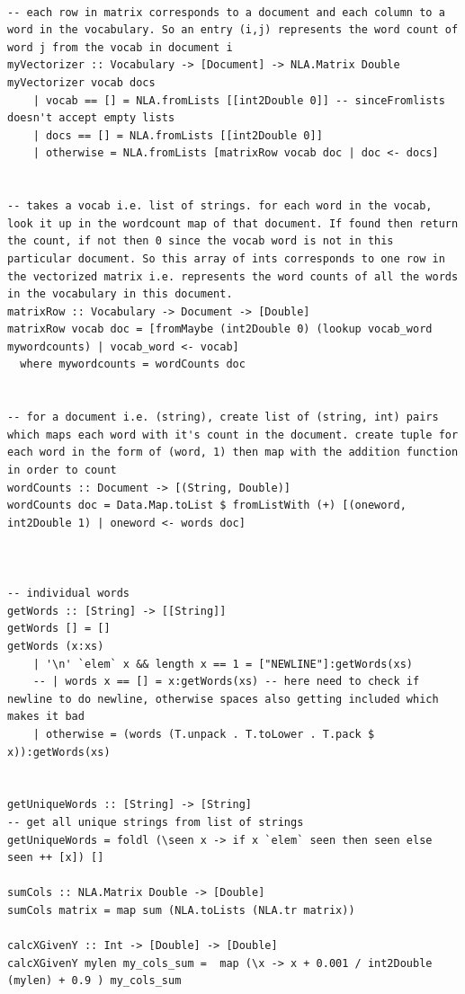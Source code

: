 \documentclass[12pt]{scrreprt}
\begin{document}
\begin{verbatim}
   
-- each row in matrix corresponds to a document and each column to a word in the vocabulary. So an entry (i,j) represents the word count of word j from the vocab in document i
myVectorizer :: Vocabulary -> [Document] -> NLA.Matrix Double
myVectorizer vocab docs
    | vocab == [] = NLA.fromLists [[int2Double 0]] -- sinceFromlists doesn't accept empty lists
    | docs == [] = NLA.fromLists [[int2Double 0]]
    | otherwise = NLA.fromLists [matrixRow vocab doc | doc <- docs]


-- takes a vocab i.e. list of strings. for each word in the vocab, look it up in the wordcount map of that document. If found then return the count, if not then 0 since the vocab word is not in this particular document. So this array of ints corresponds to one row in the vectorized matrix i.e. represents the word counts of all the words in the vocabulary in this document. 
matrixRow :: Vocabulary -> Document -> [Double]
matrixRow vocab doc = [fromMaybe (int2Double 0) (lookup vocab_word mywordcounts) | vocab_word <- vocab]
  where mywordcounts = wordCounts doc


-- for a document i.e. (string), create list of (string, int) pairs which maps each word with it's count in the document. create tuple for each word in the form of (word, 1) then map with the addition function in order to count
wordCounts :: Document -> [(String, Double)]
wordCounts doc = Data.Map.toList $ fromListWith (+) [(oneword, int2Double 1) | oneword <- words doc]



-- individual words
getWords :: [String] -> [[String]]
getWords [] = []
getWords (x:xs)
    | '\n' `elem` x && length x == 1 = ["NEWLINE"]:getWords(xs)
    -- | words x == [] = x:getWords(xs) -- here need to check if newline to do newline, otherwise spaces also getting included which makes it bad 
    | otherwise = (words (T.unpack . T.toLower . T.pack $ x)):getWords(xs)
    

getUniqueWords :: [String] -> [String]
-- get all unique strings from list of strings
getUniqueWords = foldl (\seen x -> if x `elem` seen then seen else seen ++ [x]) []

sumCols :: NLA.Matrix Double -> [Double]
sumCols matrix = map sum (NLA.toLists (NLA.tr matrix))

calcXGivenY :: Int -> [Double] -> [Double]
calcXGivenY mylen my_cols_sum =  map (\x -> x + 0.001 / int2Double (mylen) + 0.9 ) my_cols_sum

   \end{verbatim}
\end{document}

